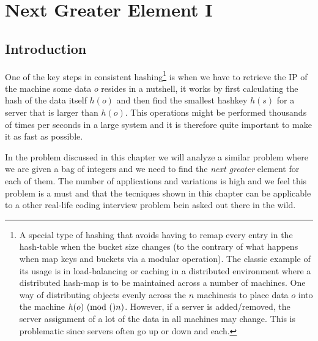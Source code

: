 %



\chapter{Next Greater Element \RN{1}}
\label{ch:next_greater_element}
\section*{Introduction}
One of the key steps in consistent hashing\footnote{A special type of hashing that avoids having to remap every entry in the hash-table when the bucket size changes (to the contrary of what happens when map keys and buckets via a modular operation). The classic example of its usage is in load-balancing or caching in a distributed environment where a distributed hash-map is to be maintained across a number of machines. One way of distributing objects evenly across the $n$ machinesis to place data $o$ into the machine $h(o) \ (\mathrm{mod}\ ()n)$.
However, if a server is added/removed, the server assignment of a lot of the data in all machines may change.
This is problematic since servers often go up or down and each. }
is when we have to retrieve the IP of the machine some data $o$ resides in a nutshell, it works by  first calculating the hash of the data itself $h(o)$ and then find the smallest hashkey $h(s)$ for a server that is larger than $h(o)$.
This operations might be performed thousands of times per seconds in a large system and it is therefore quite important to make it as fast as possible. 

In the problem discussed in this chapter we will analyze a similar problem where we are given a bag of integers and we need to find the \textit{next greater} element for each of them. The number of applications and variations is high and we feel this problem is a must and that the tecniques shown in this chapter can be applicable to a other real-life coding interview problem bein asked out there in the wild. 

